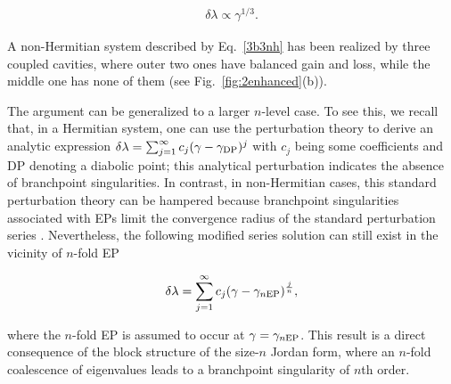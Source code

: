 \documentclass{tADP2e}
\theoremstyle{plain}
\newcommand{\eqn}[1]{
\begin{eqnarray}
	#1
\end{eqnarray}
}
\theoremstyle{plain}
\theoremstyle{definition}
\begin{document}
{\eqn{
\delta\lambda\propto \gamma^{1/3}.
}
A non-Hermitian system described by Eq.~\eqref{3b3nh} has been realized by three coupled cavities, where outer two ones have balanced gain and loss, while the middle one has none of them \cite{HH17} (see Fig.~\ref{fig:2enhanced}(b)). 

The argument can be generalized to a larger $n$-level case. To see this, we recall that, in a Hermitian system, one can use the perturbation theory to derive an analytic expression $\delta\lambda=\sum_{j=1}^{\infty}c_j(\gamma-\gamma_{\rm DP})^{j}$ with $c_j$ being some coefficients and  DP denoting a diabolic point; this analytical perturbation indicates the absence of branchpoint singularities. 
In contrast, in non-Hermitian cases, this standard perturbation theory can be hampered because branchpoint singularities associated with EPs limit the convergence radius of the standard perturbation series \cite{THS72}. 
Nevertheless, the following modified series solution can still exist in the vicinity of $n$-fold EP \cite{Heiss_2008}
\eqn{\label{nfoldep}
\delta\lambda=\sum_{j=1}^{\infty}c_j(\gamma-\gamma_{n{\rm EP}})^{\frac{j}{n}},
}
where the $n$-fold EP is assumed to occur at $\gamma=\gamma_{n{\rm EP}}$. This result is a direct consequence of the block structure of the size-$n$ Jordan form, where an $n$-fold coalescence of eigenvalues leads to a branchpoint singularity of $n$th order.

}
\end{document}
